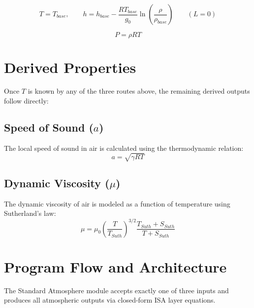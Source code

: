 \begin{equation}
T = T_{base}, \qquad
h = h_{base} - \frac{RT_{base}}{g_0}\ln\left(\frac{\rho}{\rho_{base}}\right) \qquad (L=0)
\end{equation}

\begin{equation}
P = \rho RT
\end{equation}

\section{Derived Properties}

Once $T$ is known by any of the three routes above, the remaining derived outputs follow directly:

\subsection*{Speed of Sound ($a$)}
The local speed of sound in air is calculated using the thermodynamic relation:
\begin{equation}
a = \sqrt{\gamma R T}
\end{equation}

\subsection*{Dynamic Viscosity ($\mu$)}
The dynamic viscosity of air is modeled as a function of temperature using Sutherland's law:
\begin{equation}
\mu = \mu_0\left(\frac{T}{T_{Suth}}\right)^{3/2}\frac{T_{Suth}+S_{Suth}}{T+S_{Suth}}
\end{equation}

\section{Program Flow and Architecture}

The Standard Atmosphere module accepts exactly one of three inputs and produces all atmospheric outputs via closed-form ISA layer equations.

